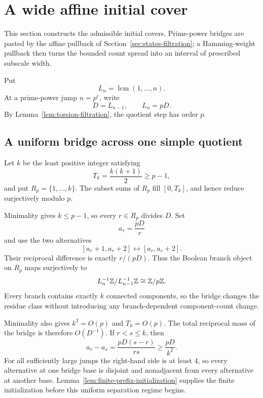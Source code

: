 \section{A wide affine initial cover}
\label{sec:wide-start}

This section constructs the admissible initial covers.  Prime-power bridges are pasted by the affine pullback of Section~\ref{sec:states-filtration}; a Hamming-weight pullback then turns the bounded count spread into an interval of prescribed subscale width.

Put
\[
L_n=\operatorname{lcm}(1,\ldots,n).
\]
At a prime-power jump $n=p^e$, write
\[
D=L_{n-1},
\qquad
L_n=pD.
\]
By Lemma~\ref{lem:torsion-filtration}, the quotient step has order $p$.

\subsection{A uniform bridge across one simple quotient}

Let $k$ be the least positive integer satisfying
\[
T_k=\frac{k(k+1)}2\ge p-1,
\]
and put $R_p=\{1,\ldots,k\}$.  The subset sums of $R_p$ fill $[0,T_k]$, and hence reduce surjectively modulo $p$.

Minimality gives $k\le p-1$, so every $r\in R_p$ divides $D$.  Set
\[
a_r=\frac{pD}{r}
\]
and use the two alternatives
\begin{equation}\label{eq:bridge-switch}
[a_r+1,a_r+2]
\longleftrightarrow
[a_r,a_r+2].
\end{equation}
Their reciprocal difference is exactly $r/(pD)$.  Thus the Boolean branch object on $R_p$ maps surjectively to
\[
L_n^{-1}\mathbb Z/L_{n-1}^{-1}\mathbb Z
\cong\mathbb Z/p\mathbb Z.
\]
Every branch contains exactly $k$ connected components, so the bridge changes the residue class without introducing any branch-dependent component-count change.

Minimality also gives $k^2=O(p)$ and $T_k=O(p)$.  The total reciprocal mass of the bridge is therefore $O(D^{-1})$.  If $r<s\le k$, then
\begin{equation}\label{eq:bridge-separation}
a_r-a_s
=\frac{pD(s-r)}{rs}
\ge\frac{pD}{k^2}.
\end{equation}
For all sufficiently large jumps the right-hand side is at least $4$, so every alternative at one bridge base is disjoint and nonadjacent from every alternative at another base.  Lemma~\ref{lem:finite-prefix-initialization} supplies the finite initialization before this uniform separation regime begins.

